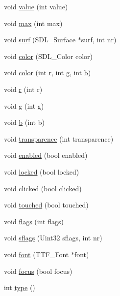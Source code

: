 \begin{DoxyCompactItemize}
void \hyperlink{classsanform_a708a44dcba41cda1cb584116ce1b92ed}{value} (int value)
\item 
void \hyperlink{classsanform_a74931da2426753fe44a630a31c619a3b}{max} (int max)
\item 
void \hyperlink{classsanform_ada949b29440eaf1093a81b4d18f62658}{surf} (S\+D\+L\+\_\+\+Surface $\ast$surf, int nr)
\item 
void \hyperlink{classsanform_a0c18f6d03ea4ab8803220d45baf3f05e}{color} (S\+D\+L\+\_\+\+Color color)
\item 
void \hyperlink{classsanform_a2150c5640eb4b4278775f3598312e39b}{color} (int \hyperlink{classsanform_abd5afd8664608ddd7a23e74a682cdfc9}{r}, int \hyperlink{classsanform_a7c638aa29f3f6a0f6f1ce582b93a60dc}{g}, int \hyperlink{classsanform_a2e7eb0109d77fcf57d37a0476f0af8bc}{b})
\item 
void \hyperlink{classsanform_abd5afd8664608ddd7a23e74a682cdfc9}{r} (int r)
\item 
void \hyperlink{classsanform_a7c638aa29f3f6a0f6f1ce582b93a60dc}{g} (int g)
\item 
void \hyperlink{classsanform_a2e7eb0109d77fcf57d37a0476f0af8bc}{b} (int b)
\item 
void \hyperlink{classsanform_a11b10d864157a2d1bab269f867915f5d}{transparence} (int transparence)
\item 
void \hyperlink{classsanform_aa89923ccc3b24f345185cfbfe603c7e2}{enabled} (bool enabled)
\item 
void \hyperlink{classsanform_ad5e19c134432e22b2820d9e59649dec3}{locked} (bool locked)
\item 
void \hyperlink{classsanform_aac79b3b6a0e019dab8d632b6635d2989}{clicked} (bool clicked)
\item 
void \hyperlink{classsanform_add1c1e201719c45566a3e779378e9544}{touched} (bool touched)
\item 
void \hyperlink{classsanform_a751b49569c24328e18c137a357423c8b}{flags} (int flags)
\item 
void \hyperlink{classsanform_ad36cdc095afea0361e1f97f0b981c6d0}{sflags} (Uint32 sflags, int nr)
\item 
void \hyperlink{classsanform_a43267216acfe78fa3d94afad434148ac}{font} (T\+T\+F\+\_\+\+Font $\ast$font)
\item 
void \hyperlink{classsanform_a583814df977fad6da56093043ecf291b}{focus} (bool focus)
\item 
int \hyperlink{classsanform_acaccaaa6bb9138b45afaf5f213249507}{type} ()
\item 

\end{DoxyCompactItemize}

